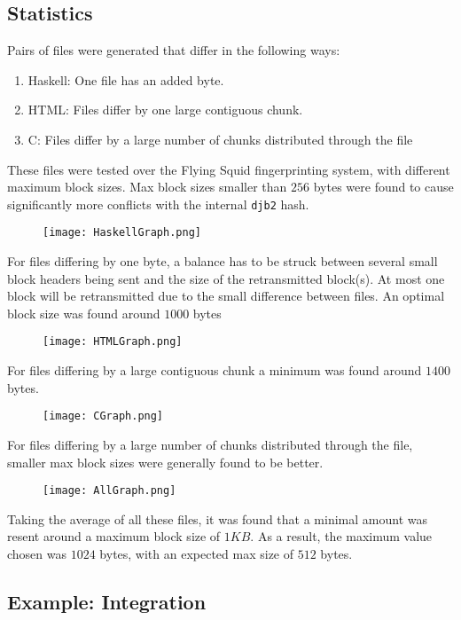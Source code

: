 \subsection {Statistics}

Pairs of files were generated that differ in the following ways:

\begin{enumerate}
\item Haskell: One file has an added byte.
\item HTML: Files differ by one large contiguous chunk.
\item C: Files differ by a large number of chunks distributed through the file
\end{enumerate}

These files were tested over the Flying Squid fingerprinting system, with different maximum block sizes. Max block sizes	smaller than $256$ bytes were found to cause significantly more conflicts with the internal \verb|djb2| hash.


\begin{figure}[H] \centering
\texttt{[image: HaskellGraph.png]}
\end{figure}

For files differing by one byte, a balance has to be struck between several small block headers being sent and the size of the retransmitted block(s). At most one block will be retransmitted due to the small difference between files. An optimal block size was found around $1000$ bytes

\begin{figure}[H] \centering
\texttt{[image: HTMLGraph.png]}
\end{figure}

For files differing by a large contiguous chunk a minimum was found around $1400$ bytes.

\begin{figure}[H] \centering
\texttt{[image: CGraph.png]}
\end{figure}

For files differing by a large number of chunks distributed through the file, smaller max block sizes were generally found to be better.


\begin{figure}[H] \centering
\texttt{[image: AllGraph.png]}
\end{figure}

Taking the average of all these files, it was found that a minimal amount was resent around a maximum block size of $1 KB$. As a result, the maximum value chosen was $1024$ bytes, with an expected max size of $512$ bytes.

\subsection{Example: Integration}

